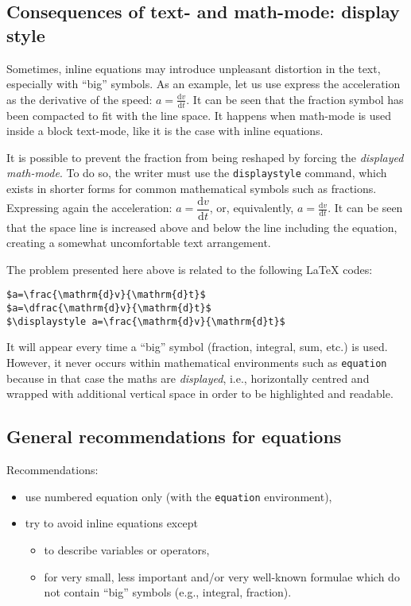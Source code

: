 	
	
	\subsection{Consequences of text- and math-mode: display style}
	
		
		Sometimes, inline equations may introduce unpleasant distortion in the text, especially with \enquote{big} symbols.
		As an example, let us use express the acceleration as the derivative of the speed:
		$a=\frac{\mathrm{d}v}{\mathrm{d}t}$.
		It can be seen that the fraction symbol has been compacted to fit with the line space.
		It happens when math-mode is used inside a block text-mode, like it is the case with inline equations.
		
		
		It is possible to prevent the fraction from being reshaped by forcing the \emph{displayed math-mode}.
		To do so, the writer must use the \texttt{displaystyle} command, which exists in shorter forms for common mathematical symbols such as fractions.
		Expressing again the acceleration:
		$a=\dfrac{\mathrm{d}v}{\mathrm{d}t}$, or, equivalently,
		$\displaystyle a=\frac{\mathrm{d}v}{\mathrm{d}t}$.
		It can be seen that the space line is increased above and below the line including the equation, creating a somewhat uncomfortable text arrangement.
		
		
		The problem presented here above is related to the following \LaTeX{} codes:
\begin{lstlisting}[language={[LaTeX]TeX}]
$a=\frac{\mathrm{d}v}{\mathrm{d}t}$
$a=\dfrac{\mathrm{d}v}{\mathrm{d}t}$
$\displaystyle a=\frac{\mathrm{d}v}{\mathrm{d}t}$
\end{lstlisting}
		It will appear every time a \enquote{big} symbol (fraction, integral, sum, etc.) is used.
		However, it never occurs within mathematical environments such as \texttt{equation} because in that case the maths are \emph{displayed}, i.e., horizontally centred and wrapped with additional vertical space in order to be highlighted and readable.
	
	
	\subsection{General recommendations for equations}
		
		Recommendations:
		\begin{itemize}
			\item use numbered equation only (with the \texttt{equation} environment),
			\item try to avoid inline equations except
			\begin{itemize}
				\item to describe variables or operators,
				\item for very small, less important and/or very well-known formulae which do not contain \enquote{big} symbols (e.g., integral, fraction).
			\end{itemize}
		\end{itemize}
	
